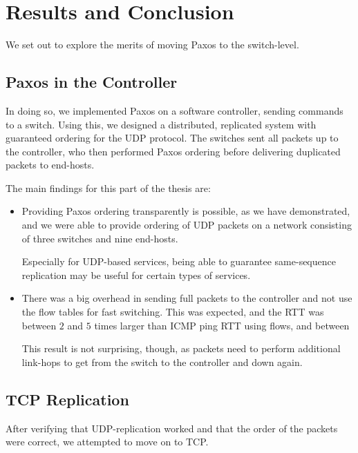 \chapter{Results and Conclusion}
\label{chapter:conclusion}

We set out to explore the merits of moving Paxos to the switch-level.

\section{Paxos in the Controller}

In doing so, we implemented Paxos on a software controller, sending commands
to a switch.  Using this, we designed a distributed, replicated system with
guaranteed ordering for the UDP protocol.  The switches sent all packets up
to the controller, who then performed Paxos ordering before delivering
duplicated packets to end-hosts.

The main findings for this part of the thesis are:

\begin{itemize}
  \item Providing Paxos ordering transparently is possible, as we have
  demonstrated, and we were able to provide ordering of \acs{UDP} packets on
  a network consisting of three switches and nine end-hosts.

  Especially for UDP-based services, being able to guarantee same-sequence
  replication may be useful for certain types of services.


  \item There was a big overhead in sending full packets to the controller
  and not use the flow tables for fast switching.  This was expected, and
  the \acs{RTT} was between $2$ and $5$ times larger than ICMP ping RTT
  using flows, and between

  This result is not surprising, though, as packets need to perform
  additional link-hops to get from the switch to the controller and down
  again.

\end{itemize}

\section{TCP Replication}
\label{chapter:tcp.replication}

After verifying that UDP-replication worked and that the order of the
packets were correct, we attempted to move on to TCP.

